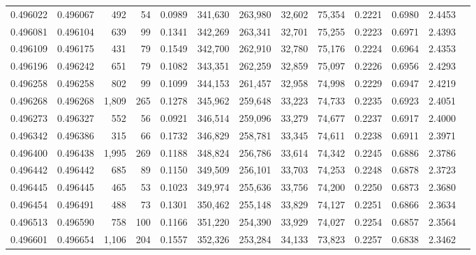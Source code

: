 \begin{tabular}{rrrrrrrrrrrrr}
0.496022 & 0.496067 &   492 &    54 &                                     0.0989 & 341,630 & 263,980 &  32,602 &  75,354 & 0.2221 & 0.6980 & 2.4453 \\
0.496081 & 0.496104 &   639 &    99 &                                     0.1341 & 342,269 & 263,341 &  32,701 &  75,255 & 0.2223 & 0.6971 & 2.4393 \\
0.496109 & 0.496175 &   431 &    79 &                                     0.1549 & 342,700 & 262,910 &  32,780 &  75,176 & 0.2224 & 0.6964 & 2.4353 \\
0.496196 & 0.496242 &   651 &    79 &                                     0.1082 & 343,351 & 262,259 &  32,859 &  75,097 & 0.2226 & 0.6956 & 2.4293 \\
0.496258 & 0.496258 &   802 &    99 &                                     0.1099 & 344,153 & 261,457 &  32,958 &  74,998 & 0.2229 & 0.6947 & 2.4219 \\
0.496268 & 0.496268 & 1,809 &   265 &                                     0.1278 & 345,962 & 259,648 &  33,223 &  74,733 & 0.2235 & 0.6923 & 2.4051 \\
0.496273 & 0.496327 &   552 &    56 &                                     0.0921 & 346,514 & 259,096 &  33,279 &  74,677 & 0.2237 & 0.6917 & 2.4000 \\
0.496342 & 0.496386 &   315 &    66 &                                     0.1732 & 346,829 & 258,781 &  33,345 &  74,611 & 0.2238 & 0.6911 & 2.3971 \\
0.496400 & 0.496438 & 1,995 &   269 &                                     0.1188 & 348,824 & 256,786 &  33,614 &  74,342 & 0.2245 & 0.6886 & 2.3786 \\
0.496442 & 0.496442 &   685 &    89 &                                     0.1150 & 349,509 & 256,101 &  33,703 &  74,253 & 0.2248 & 0.6878 & 2.3723 \\
0.496445 & 0.496445 &   465 &    53 &                                     0.1023 & 349,974 & 255,636 &  33,756 &  74,200 & 0.2250 & 0.6873 & 2.3680 \\
0.496454 & 0.496491 &   488 &    73 &                                     0.1301 & 350,462 & 255,148 &  33,829 &  74,127 & 0.2251 & 0.6866 & 2.3634 \\
0.496513 & 0.496590 &   758 &   100 &                                     0.1166 & 351,220 & 254,390 &  33,929 &  74,027 & 0.2254 & 0.6857 & 2.3564 \\
0.496601 & 0.496654 & 1,106 &   204 &                                     0.1557 & 352,326 & 253,284 &  34,133 &  73,823 & 0.2257 & 0.6838 & 2.3462 \\

\end{tabular}
